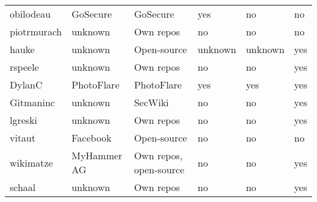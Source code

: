 \begin{landscape}
\begin{table}[]
\begin{tabular}{llllll}
            obilodeau     & GoSecure      & GoSecure                           & yes             & no                     & no             \\
            piotrmurach   & unknown       & Own repos                          & no              & no                     & no             \\
            hauke         & unknown       & Open-source                        & unknown         & unknown                & yes            \\
            rspeele       & unknown       & Own repos                          & no              & no                     & yes            \\
            DylanC        & PhotoFlare    & PhotoFlare                         & yes             & yes                    & yes            \\
            Gitmaninc     & unknown       & SecWiki                            & no              & no                     & yes            \\
            lgreski       & unknown       & Own repos                          & no              & no                     & yes            \\
            vitaut        & Facebook      & Open-source                        & no              & no                     & no             \\
            wikimatze     & MyHammer AG   & Own repos, open-source             & no              & no                     & yes            \\
            schaal        & unknown       & Own repos                          & no              & no                     & yes
        \end{tabular}
    \end{table}
\end{landscape}
